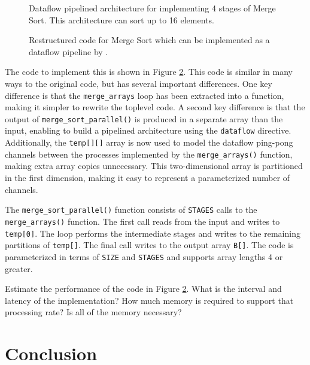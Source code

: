 \begin{figure}
\centering

\caption{Dataflow pipelined architecture for implementing 4 stages of Merge Sort.  This architecture can sort up to 16 elements.}
\label{fig:restructured_mergesort_dataflow}
\end{figure}

\begin{figure}
\footnotesize

\caption{Restructured code for Merge Sort which can be implemented as a dataflow pipeline by \VHLS.}
\label{fig:merge_sort_parallel.cpp}
\end{figure}

The code to implement this is shown in Figure \ref{fig:merge_sort_parallel.cpp}.  This code is similar in many ways to the original code, but has several important differences.  One key difference is that the \lstinline{merge_arrays} loop has been extracted into a function, making it simpler to rewrite the toplevel code. A second key difference is that the output of \lstinline{merge_sort_parallel()} is produced in a separate array than the input, enabling \VHLS to build a pipelined architecture using the \lstinline{dataflow} directive.  Additionally, the \lstinline{temp[][]} array is now used to model the dataflow ping-pong channels between the processes implemented by the \lstinline{merge_arrays()} function, making extra array copies unnecessary.  This two-dimensional array is partitioned in the first dimension, making it easy to represent a parameterized number of channels.

The \lstinline{merge_sort_parallel()} function consists of \lstinline{STAGES} calls to the \lstinline{merge_arrays()} function.  The first call reads from the input and writes to \lstinline{temp[0]}.  The loop performs the intermediate stages  and writes to the remaining partitions of \lstinline{temp[]}.  The final call writes to the output array \lstinline{B[]}.  The code is parameterized in terms of \lstinline{SIZE} and \lstinline{STAGES} and supports array lengths 4 or greater.

\begin{aside}
Estimate the performance of the code in Figure \ref{fig:merge_sort_parallel.cpp}.  What is the interval and latency of the implementation?  How much memory is required to support that processing rate?   Is all of the memory necessary?
\end{aside}

\section{Conclusion}

